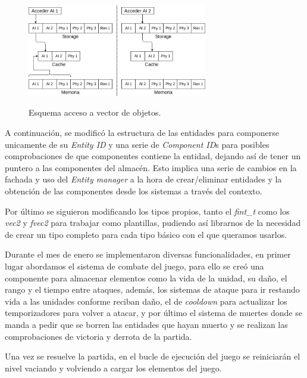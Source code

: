 \begin{figure}[hbt]
\centering
\includegraphics[width=0.7\textwidth]{imagenes/diario_desarrollo/memoria1.png}\\
\caption{Esquema acceso a vector de objetos.}
\label{fig:memoria_obj}
\end{figure}


A continuación, se modificó la estructura de las entidades para componerse unicamente de su
\textit{Entity ID} y una serie de \textit{Component ID}s para posibles comprobaciones de que
componentes contiene la entidad, dejando así de tener un puntero a las componentes del almacén.
Esto implica una serie de cambios en la fachada y uso del \textit{Entity manager} a la hora
de crear/eliminar entidades y la obtención de las componentes desde los sistemas a través del
contexto. 

Por último se siguieron modificando los tipos propios, tanto el \textit{fint\_t} como
los \textit{vec2} y \textit{fvec2} para trabajar como plantillas, pudiendo así librarnos de
la necesidad de crear un tipo completo para cada tipo básico con el que queramos usarlos.

Durante el mes de enero se implementaron diversas funcionalidades, en primer lugar abordamos
el sistema de combate del juego, para ello se creó una componente para almacenar elementos como
la vida de la unidad, su daño, el rango y el tiempo entre ataques, además, los sistemas de 
ataque para ir restando vida a las unidades conforme reciban daño, el de \textit{cooldown} para
actualizar los temporizadores para volver a atacar, y por último el sistema de muertes donde se
manda a pedir que se borren las entidades que hayan muerto y se realizan las comprobaciones 
de victoria y derrota de la partida.

Una vez se resuelve la partida, en el bucle de ejecución del juego se reiniciarán el nivel
vaciando y volviendo a cargar los elementos del juego.

